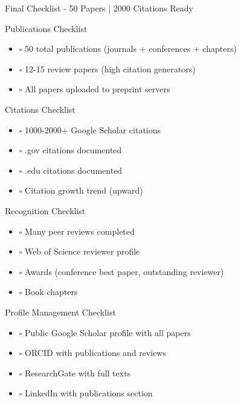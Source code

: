 \documentclass[11pt]{beamer}
\begin{document}
	\begin{frame}{Final Checklist - 50 Papers | 2000 Citations Ready}
		\scriptsize
		\begin{block}{Publications Checklist}
			\begin{itemize}
				\item $\square$ 50 total publications (journals + conferences + chapters)
				\item $\square$ 12-15 review papers (high citation generators)
				\item $\square$ All papers uploaded to preprint servers
			\end{itemize}
		\end{block}
		\begin{block}{Citations Checklist}
			\begin{itemize}
				\item $\square$ 1000-2000+ Google Scholar citations
				\item $\square$ .gov citations documented
				\item $\square$ .edu citations documented
				\item $\square$ Citation growth trend (upward)
			\end{itemize}
		\end{block}
		\begin{block}{Recognition Checklist}
			\begin{itemize}
				\item $\square$ Many peer reviews completed
				\item $\square$ Web of Science reviewer profile
				\item $\square$ Awards (conference best paper, outstanding reviewer)
				\item $\square$ Book chapters
			\end{itemize}
		\end{block}
		\begin{block}{Profile Management Checklist}
			\begin{itemize}
				\item $\square$ Public Google Scholar profile with all papers
				\item $\square$ ORCID with publications and reviews
				\item $\square$ ResearchGate with full texts
				\item $\square$ LinkedIn with publications section
			\end{itemize}
		\end{block}
	\end{frame}
	
\end{document}
